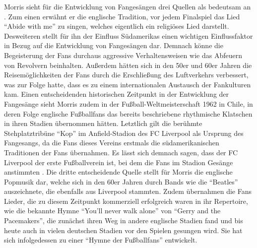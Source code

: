 Morris sieht für die Entwicklung von Fangesängen drei Quellen als bedeutsam an \cite[S. 65]{RK98}.
Zum einen erwähnt er die englische Tradition, vor jedem Finalspiel das Lied "`Abide with me"' zu singen, welches eigentlich ein religiöses Lied darstellt.
Desweiteren stellt für ihn der Einfluss Südamerikas einen wichtigen Einflussfaktor in Bezug auf die Entwicklung von Fangesängen dar.
Demnach könne die Begeisterung der Fans durchaus aggressive Verhaltensweisen wie das Abfeuern von Revolvern beinhalten.
Außerdem hätten sich in den 50er und 60er Jahren die Reisemöglichkeiten der Fans durch die Erschließung des Luftverkehrs verbessert, was zur Folge hatte, dass es zu einem internationalen Austausch der Fankulturen kam.
Einen entscheidenden historischen Zeitpunkt in der Entwicklung der Fangesänge sieht Morris zudem in der Fußball-Weltmeisterschaft 1962 in Chile, in deren Folge englische Fußballfans das bereits beschriebene rhythmische Klatschen in ihren Stadien übernommen hätten.
Letztlich gilt die berühmte Stehplatztribüne "`Kop"' im Anfield-Stadion des FC Liverpool als Ursprung des Fangesangs, da die Fans dieses Vereins erstmals die südamerikanischen Traditionen der Fans übernahmen.
Es lässt sich demnach sagen, dass der FC Liverpool der erste Fußballverein ist, bei dem die Fans im Stadion Gesänge anstimmten \cite[S. 28]{JK07}.
Die dritte entscheidende Quelle stellt für Morris die englische Popmusik dar, welche sich in den 60er Jahren durch Bands wie die "`Beatles"' auszeichnete, die ebenfalls aus Liverpool stammten.
Zudem übernahmen die Fans Lieder, die zu diesem Zeitpunkt kommerziell erfolgreich waren in ihr Repertoire, wie die bekannte Hymne "`You'll never walk alone"' von "`Gerry and the Pacemakers"', die zunächst ihren Weg in andere englische Stadien fand und bis heute auch in vielen deutschen Stadien vor den Spielen gesungen wird.
Sie hat sich infolgedessen zu einer "`Hymne der Fußballfans"' entwickelt.

